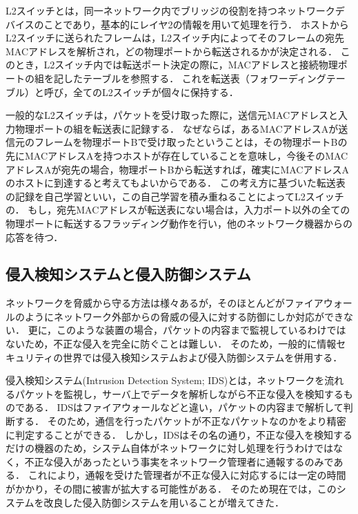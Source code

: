 L2スイッチとは，同一ネットワーク内でブリッジの役割を持つネットワークデバイスのことであり，基本的にレイヤ2の情報を用いて処理を行う\cite{masteringtcpip}．
ホストからL2スイッチに送られたフレームは，L2スイッチ内によってそのフレームの宛先MACアドレスを解析され，どの物理ポートから転送されるかが決定される．
このとき，L2スイッチ内では転送ポート決定の際に，MACアドレスと接続物理ポートの組を記したテーブルを参照する．
これを転送表（フォワーディングテーブル）と呼び，全てのL2スイッチが個々に保持する．

一般的なL2スイッチは，パケットを受け取った際に，送信元MACアドレスと入力物理ポートの組を転送表に記録する．
なぜならば，あるMACアドレスAが送信元のフレームを物理ポートBで受け取ったということは，その物理ポートBの先にMACアドレスAを持つホストが存在していることを意味し，今後そのMACアドレスAが宛先の場合，物理ポートBから転送すれば，確実にMACアドレスAのホストに到達すると考えてもよいからである．
この考え方に基づいた転送表の記録を自己学習といい，この自己学習を積み重ねることによってL2スイッチの．
もし，宛先MACアドレスが転送表にない場合は，入力ポート以外の全ての物理ポートに転送するフラッディング動作を行い，他のネットワーク機器からの応答を待つ．

\subsection{侵入検知システムと侵入防御システム}

ネットワークを脅威から守る方法は様々あるが，そのほとんどがファイアウォールのようにネットワーク外部からの脅威の侵入に対する防御にしか対応ができない．
更に，このような装置の場合，パケットの内容まで監視しているわけではないため，不正な侵入を完全に防ぐことは難しい．
そのため，一般的に情報セキュリティの世界では侵入検知システムおよび侵入防御システムを併用する．

侵入検知システム(Intrusion Detection System; IDS)とは，ネットワークを流れるパケットを監視し，サーバ上でデータを解析しながら不正な侵入を検知するものである\cite{idsandips}．
IDSはファイアウォールなどと違い，パケットの内容まで解析して判断する．
そのため，通信を行ったパケットが不正なパケットなのかをより精密に判定することができる．
しかし，IDSはその名の通り，不正な侵入を検知するだけの機器のため，システム自体がネットワークに対し処理を行うわけではなく，不正な侵入があったという事実をネットワーク管理者に通報するのみである．
これにより，通報を受けた管理者が不正な侵入に対応するには一定の時間がかかり，その間に被害が拡大する可能性がある．
そのため現在では，このシステムを改良した侵入防御システムを用いることが増えてきた．

